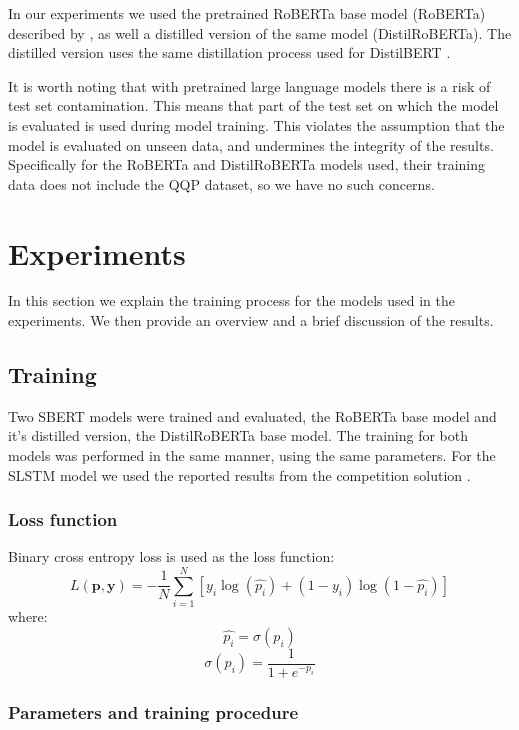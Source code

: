 \documentclass[10pt, a4paper]{article}
\begin{document}
In our experiments we used the pretrained RoBERTa base model (RoBERTa) described by \citet{liu2019roberta}, as well a distilled version of the same model (DistilRoBERTa). The distilled version uses the same distillation process used for DistilBERT \cite{sanh2019distilbert}.

It is worth noting that with pretrained large language models there is a risk of test set contamination.
This means that part of the test set on which the model is evaluated is used during model training. This violates the assumption that the model is evaluated on unseen data, and undermines the integrity of the results.
Specifically for the RoBERTa and DistilRoBERTa models used, their training data does not include the QQP dataset, so we have no such concerns.

\section{Experiments}

In this section we explain the training process for the models used in the experiments.
We then provide an overview and a brief discussion of the results.

\subsection{Training} \label{training}

Two SBERT models were trained and evaluated, the RoBERTa base model and it's distilled version, the DistilRoBERTa base model.
The training for both models was performed in the same manner, using the same parameters.
For the SLSTM model we used the reported results from the competition solution \citep{dadashov2017quora}.

\subsubsection{Loss function}

Binary cross entropy loss is used as the loss function:
$$
L(\mathbf{p}, \mathbf{y}) = -\frac{1}{N} \sum_{i=1}^{N} \left[ y_i \log \left( \hat{p_i} \right) + (1 - y_i) \log \left( 1 - \hat{p_i} \right) \right]
$$
where:
$$
\hat{p_i} = \sigma(p_i)
$$
$$
\sigma(p_i) = \frac{1}{1 + e^{-p_i}}
$$

\subsubsection{Parameters and training procedure}
\end{document}
